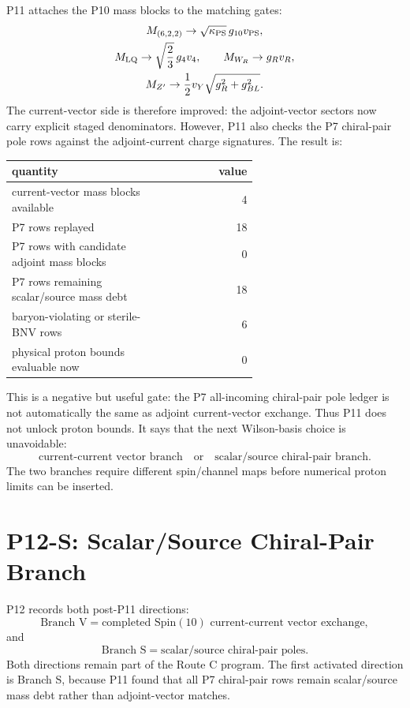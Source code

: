 \documentclass[11pt]{article}
\newcommand{\Spin}{\mathrm{Spin}}
\begin{document}
P11 attaches the P10 mass blocks to the matching gates:
\begin{equation}
\begin{gathered}
  M_{(6,2,2)}\to \sqrt{\kappa_{\rm PS}}\,g_{10}v_{\rm PS},\\
  M_{\rm LQ}\to \sqrt{\frac23}\,g_4v_4,\qquad
  M_{W_R}\to g_Rv_R,\\
  M_{Z'}\to \frac12 v_Y\sqrt{g_R^2+g_{BL}^2}.
\end{gathered}
\end{equation}
The current-vector side is therefore improved: the adjoint-vector sectors now
carry explicit staged denominators.  However, P11 also checks the P7
chiral-pair pole rows against the adjoint-current charge signatures.  The
result is:
\begin{center}
\small
\begin{tabular}{p{0.62\linewidth}r}
\toprule
quantity & value\\
\midrule
current-vector mass blocks available & 4\\
P7 rows replayed & 18\\
P7 rows with candidate adjoint mass blocks & 0\\
P7 rows remaining scalar/source mass debt & 18\\
baryon-violating or sterile-BNV rows & 6\\
physical proton bounds evaluable now & 0\\
\bottomrule
\end{tabular}
\end{center}
This is a negative but useful gate: the P7 all-incoming chiral-pair pole
ledger is not automatically the same as adjoint current-vector exchange.  Thus
P11 does not unlock proton bounds.  It says that the next Wilson-basis choice
is unavoidable:
\begin{equation}
  \text{current-current vector branch}
  \quad\text{or}\quad
  \text{scalar/source chiral-pair branch}.
\end{equation}
The two branches require different spin/channel maps before numerical proton
limits can be inserted.

\section{P12-S: Scalar/Source Chiral-Pair Branch}

P12 records both post-P11 directions:
\begin{equation}
  \text{Branch V}=\text{completed }\Spin(10)\text{ current-current vector exchange},
\end{equation}
and
\begin{equation}
  \text{Branch S}=\text{scalar/source chiral-pair poles}.
\end{equation}
Both directions remain part of the Route C program.  The first activated
direction is Branch S, because P11 found that all P7 chiral-pair rows remain
scalar/source mass debt rather than adjoint-vector matches.
\end{document}
